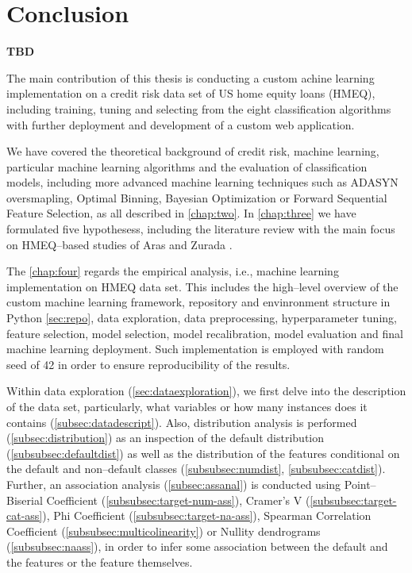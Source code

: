 \chapter{Conclusion}
\label{conclusion}

\textbf{TBD}

The main contribution of this thesis is conducting a custom achine learning implementation on a credit risk data set of US home equity loans (HMEQ), including training, tuning and selecting from the eight classification algorithms with further deployment and development of a custom web application.

We have covered the theoretical background of credit risk, machine learning, particular machine learning algorithms and the evaluation of classification models, including more advanced machine learning techniques such as ADASYN oversmapling, Optimal Binning, Bayesian Optimization or Forward Sequential Feature Selection, as all described in \autoref{chap:two}.
In \autoref{chap:three} we have formulated five hypothesess, including the literature review with the main focus on HMEQ--based studies of Aras \citep{serkan2021bagging} and Zurada \citep{zurada2014classification}.


The \autoref{chap:four} regards the empirical analysis, i.e., machine learning implementation on HMEQ data set.  This includes the high--level overview of the custom machine learning framework, repository and envinronment structure in Python \autoref{sec:repo}, data exploration, data preprocessing, hyperparameter tuning, feature selection, model selection, model recalibration, model evaluation and final machine learning deployment.
Such implementation is employed with random seed of 42 in order to ensure reproducibility of the results.

Within data exploration (\autoref{sec:dataexploration}), we first delve into the description of the data set, particularly, what variables or how many instances does it contains (\autoref{subsec:datadescript}).
Also, distribution analysis is performed (\autoref{subsec:distribution}) as an inspection of the default distribution (\autoref{subsubsec:defaultdist}) as well as the distribution of the features conditional on the default and non--default classes (\autoref{subsubsec:numdist}, \autoref{subsubsec:catdist}).
Further, an association analysis (\autoref{subsec:assanal}) is conducted using Point--Biserial Coefficient (\autoref{subsubsec:target-num-ass}),
Cramer's V (\autoref{subsubsec:target-cat-ass}), Phi Coefficient (\autoref{subsubsec:target-na-ass}), Spearman Correlation Coefficient (\autoref{subsubsec:multicolinearity}) or Nullity dendrograms (\autoref{subsubsec:naass}), in order to infer some association between the default and the features or the feature themselves.

